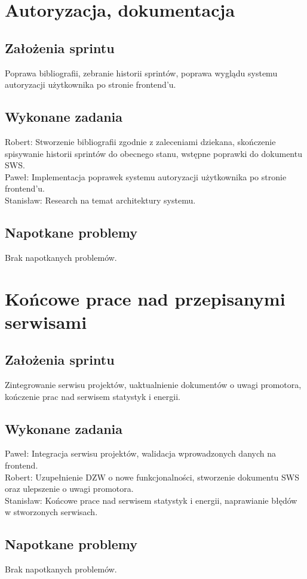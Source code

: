 \documentclass[a4paper,11pt]{report}
\begin{document}
\section {Autoryzacja, dokumentacja}
\subsection {Założenia sprintu}
Poprawa bibliografii, zebranie historii sprintów, poprawa wyglądu systemu autoryzacji użytkownika po stronie frontend'u.
\subsection {Wykonane zadania}
Robert: Stworzenie bibliografii zgodnie z zaleceniami dziekana, skończenie spisywanie historii sprintów do obecnego stanu, wstępne poprawki do dokumentu SWS.\\
Paweł: Implementacja poprawek systemu autoryzacji użytkownika po stronie frontend'u.\\
Stanisław: Research na temat architektury systemu.\\
\subsection {Napotkane problemy}
Brak napotkanych problemów.

\section {Końcowe prace nad przepisanymi serwisami}
\subsection {Założenia sprintu}
Zintegrowanie serwisu projektów, uaktualnienie dokumentów o uwagi promotora, kończenie prac nad serwisem statystyk i energii.
\subsection {Wykonane zadania}
Paweł: Integracja serwisu projektów, walidacja wprowadzonych danych na frontend.\\
Robert: Uzupełnienie DZW o nowe funkcjonalności, stworzenie dokumentu SWS oraz ulepszenie o uwagi promotora.\\
Stanisław: Końcowe prace nad serwisem statystyk i energii, naprawianie błędów w stworzonych serwisach.\\
\subsection {Napotkane problemy}
Brak napotkanych problemów.
\end{document}
